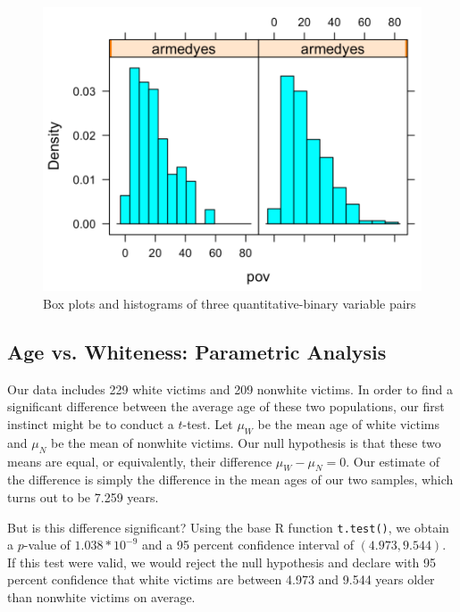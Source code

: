 \begin{figure}[h]
    \includegraphics[scale=.3]{histplot_pov_armedyes.png}
    \caption{Box plots and histograms of three quantitative-binary variable pairs }
    \label{fig:twosample_boxplots}
\end{figure}

\subsection{Age vs. Whiteness: Parametric Analysis}

\par Our data includes 229 white victims and 209 nonwhite victims. In order to find a significant difference between the average age of these two populations, our first instinct might be to conduct a $t$-test. Let $\mu_W$ be the mean age of white victims and $\mu_N$ be the mean of nonwhite victims. Our null hypothesis is that these two means are equal, or equivalently, their difference $\mu_W - \mu_N = 0$. Our estimate of the difference is simply the difference in the mean ages of our two samples, which turns out to be 7.259 years.

\par \bigskip But is this difference significant? Using the base R function \texttt{t.test()}, we obtain a $p$-value of $1.038*10^{-9}$ and a 95 percent confidence interval of $(4.973, 9.544)$. If this test were valid, we would reject the null hypothesis and declare with 95 percent confidence that white victims are between 4.973 and 9.544 years older than nonwhite victims on average.

